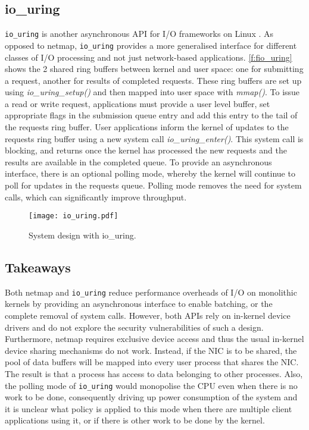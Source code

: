 \subsection{io\_uring}\label{io_uring}
\lstinline{io_uring} is another asynchronous API for I/O frameworks on Linux \cite{io_uring}. 
As opposed to netmap, \lstinline{io_uring} provides a more generalised interface for different 
classes of I/O processing and not just network-based applications. \autoref{f:fio_uring} shows the 2 shared
ring buffers between kernel and user space: one for submitting a request, another for results of completed requests. 
These ring buffers are set up using \emph{io\_uring\_setup()} and then mapped into user space with \emph{mmap()}. 
To issue a read or write request, applications must provide a user level buffer, set appropriate flags in the submission
queue entry and add this entry to the tail of the requests ring buffer. User applications inform
the kernel of updates to the requests ring buffer using a new system call \emph{io\_uring\_enter()}. This system call is blocking, 
and returns once the kernel has processed the new requests and the results are available in the completed queue. 
To provide an asynchronous interface, there is an optional polling mode, whereby the kernel will continue to poll for updates
in the requests queue. Polling mode removes the need for system calls, which can significantly improve throughput.

\begin{figure}[h]
	\centering
	\texttt{[image: io\_uring.pdf]}
	\caption{System design with io\_uring.}
	\label{f:fio_uring}
  \end{figure}

\subsection{Takeaways}
Both netmap \cite{Rizzo_12} and \lstinline{io_uring} \cite{io_uring} reduce performance overheads of I/O on monolithic kernels
by providing an asynchronous interface to enable batching, or the complete removal of system calls. However, both APIs 
rely on in-kernel device drivers and do not explore the security vulnerabilities of such a design. 
Furthermore, netmap requires exclusive device access and thus the usual in-kernel device sharing mechanisms do not work. 
Instead, if the NIC is to be shared, the pool of data buffers will be mapped into every user process that shares the NIC. 
The result is that a process has access to data belonging to other processes. Also, the polling mode of
\lstinline{io_uring} would monopolise the CPU even when there is no work to be done, consequently driving up
power consumption of the system and it is unclear what policy is applied to this mode when there are multiple client
applications using it, or if there is other work to be done by the kernel.

